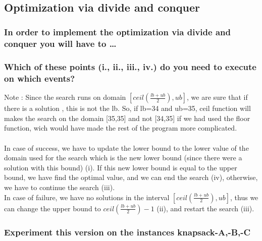 \documentclass[a4paper ,12pt,french]{article}
\begin{document}
\newpage
\
\newpage

\subsection{Optimization via divide and conquer}

\subsubsection{In order to implement the optimization via divide and conquer you will have to \dots}

\subsubsection{Which of these points (i., ii., iii., iv.) do you need to execute on which events?}
Note : Since the search runs on domain $[ceil(\frac{lb + ub}{2}),ub]$, we are sure that if there is a solution , this is not the lb. So, if lb=34 and ub=35, ceil function will makes the search on the domain [35,35] and not [34,35] if we had used the floor function, wich would have made the rest of the program more complicated.\\\\

In case of success, we have to update the lower bound to the lower value of the domain used for the search which is the new lower bound (since there were a solution with this bound) (i). If this new lower bound is equal to the upper bound, we have find the optimal value, and we can end the search (iv), otherwise, we have to continue the search (iii).\\

In case of failure, we have no solutions in the interval $[ceil(\frac{lb + ub}{2}),ub]$, thus we can change the upper bound to $ceil(\frac{lb + ub}{2})-1$ (ii), and restart the search (iii).\\


\subsubsection{Experiment this version on the instances knapsack-A,-B,-C}
\end{document}
